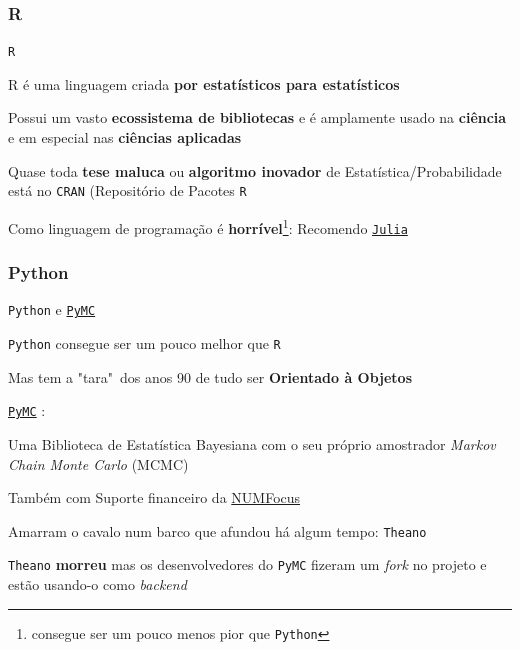 \subsubsection{R}
\begin{frame}{\texttt{R}}
    \begin{vfilleditems}
        \item R é uma linguagem criada \textbf{por estatísticos para estatísticos}
        \item Possui um vasto \textbf{ecossistema de bibliotecas} e é amplamente usado na \textbf{ciência} e em especial nas \textbf{ciências aplicadas}
        \item Quase toda \textbf{tese maluca} ou \textbf{algoritmo inovador} de Estatística/Probabilidade está no \texttt{CRAN} (Repositório de Pacotes \texttt{R}
        \item Como linguagem de programação é \textbf{horrível}\footnote{consegue ser um pouco menos pior que \texttt{Python}}: Recomendo \href{https://julialang.org/}{\texttt{Julia}}
    \end{vfilleditems}
\end{frame}

\subsubsection{Python}
\begin{frame}{\texttt{Python} e \href{http://docs.pymc.io/}{\texttt{PyMC}}}
    \begin{vfilleditems}
        \item \texttt{Python} consegue ser um pouco melhor que \texttt{R}
        \item Mas tem a "tara"~dos anos 90 de tudo ser \textbf{Orientado à Objetos}
        \item \href{http://docs.pymc.io/}{\texttt{PyMC}} \citep{pymc3}:
        \begin{vfilleditems}
            \item Uma Biblioteca de Estatística Bayesiana com o seu próprio amostrador \textit{Markov Chain Monte Carlo} (MCMC)
            \item Também com Suporte financeiro da \href{https://numfocus.org/}{NUMFocus}
            \item Amarram o cavalo num barco que afundou há algum tempo: \texttt{Theano}
            \item \texttt{Theano} \textbf{morreu} mas os desenvolvedores do \texttt{PyMC} fizeram um \textit{fork} no projeto e estão usando-o como \textit{backend}
        \end{vfilleditems}
    \end{vfilleditems}
\end{frame}

